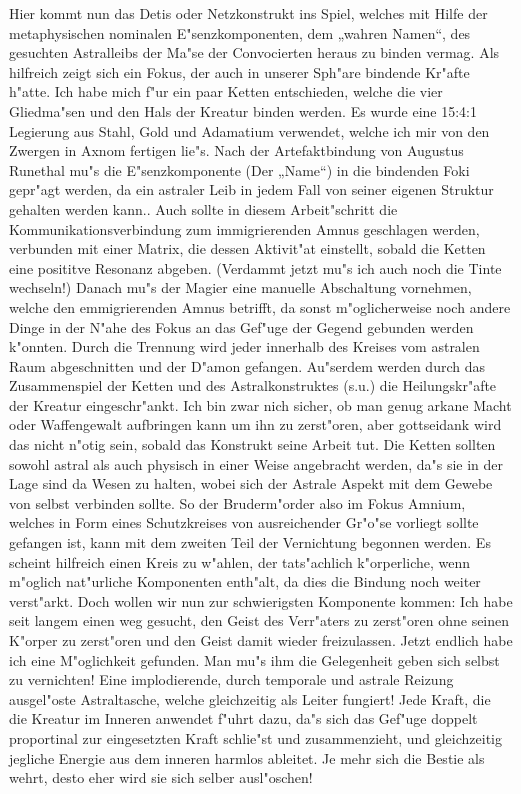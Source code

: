 \documentclass[a5paper,8pt]{book}
\begin{document}
Hier kommt nun das Detis oder Netzkonstrukt ins Spiel, welches mit Hilfe der metaphysischen nominalen E"senzkomponenten, dem „wahren Namen“, des gesuchten Astralleibs der Ma"se der Convocierten heraus zu binden vermag. Als hilfreich zeigt sich ein Fokus, der auch in unserer Sph"are bindende Kr"afte h"atte. Ich habe mich f"ur ein paar Ketten entschieden, welche die vier Gliedma"sen und den Hals der Kreatur binden werden.
Es wurde eine 15:4:1 Legierung aus Stahl, Gold und Adamatium verwendet, welche ich mir von den Zwergen in Axnom fertigen lie"s.
Nach der Artefaktbindung von Augustus Runethal mu"s die E"senzkomponente (Der „Name“) in die bindenden Foki gepr"agt werden, da ein astraler Leib in jedem Fall von seiner eigenen Struktur gehalten werden kann.. Auch sollte in diesem Arbeit"schritt die Kommunikationsverbindung zum immigrierenden Amnus geschlagen werden, verbunden mit einer Matrix, die dessen Aktivit"at einstellt, sobald die Ketten eine posititve Resonanz abgeben. (Verdammt jetzt mu"s ich auch noch die Tinte wechseln!)
Danach mu"s der Magier eine manuelle Abschaltung vornehmen, welche den emmigrierenden Amnus betrifft, da sonst m"oglicherweise noch andere Dinge in der N"ahe des Fokus an das Gef"uge der Gegend gebunden werden k"onnten.
Durch die Trennung wird jeder innerhalb des Kreises vom astralen Raum abgeschnitten und der D"amon gefangen. Au"serdem werden durch das Zusammenspiel der Ketten und des Astralkonstruktes (s.u.) die Heilungskr"afte der Kreatur eingeschr"ankt. Ich bin zwar nich sicher, ob man genug arkane Macht oder Waffengewalt aufbringen kann um ihn zu zerst"oren, aber gottseidank wird das nicht n"otig sein, sobald das Konstrukt seine Arbeit tut.
Die Ketten sollten sowohl astral als auch physisch in einer Weise angebracht werden, da"s sie in der Lage sind da Wesen zu halten, wobei sich der Astrale Aspekt mit dem Gewebe von selbst verbinden sollte.
So der Bruderm"order also im Fokus Amnium, welches in Form eines Schutzkreises von ausreichender Gr"o"se vorliegt sollte gefangen ist, kann mit dem zweiten Teil der Vernichtung begonnen werden.
Es scheint hilfreich einen Kreis zu w"ahlen, der tats"achlich k"orperliche, wenn m"oglich nat"urliche Komponenten enth"alt, da dies die Bindung noch weiter verst"arkt.
Doch wollen wir nun zur schwierigsten Komponente kommen:
Ich habe seit langem einen weg gesucht, den Geist des Verr"aters zu zerst"oren ohne seinen K"orper zu zerst"oren und den Geist damit wieder freizulassen. Jetzt endlich habe ich eine M"oglichkeit gefunden. Man mu"s ihm die Gelegenheit geben sich selbst zu vernichten!
Eine implodierende, durch temporale und astrale Reizung ausgel"oste Astraltasche, welche gleichzeitig als Leiter fungiert! Jede Kraft, die die Kreatur im Inneren anwendet f"uhrt dazu, da"s sich das Gef"uge doppelt proportinal zur eingesetzten Kraft schlie"st und zusammenzieht, und gleichzeitig jegliche Energie aus dem inneren harmlos ableitet. Je mehr sich die Bestie als wehrt, desto eher wird sie sich selber ausl"oschen!
\end{document}
